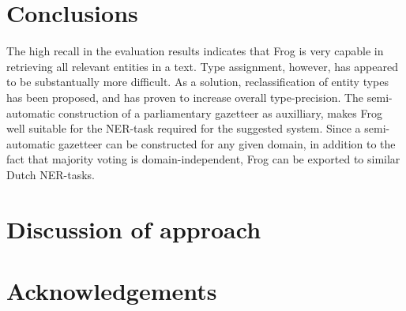 \section{Conclusions}
\label{sec:conc}
The high recall in the evaluation results indicates that Frog is very capable in retrieving all relevant entities in a text. Type assignment, however, has appeared to be substantually more difficult. As a solution, reclassification of entity types has been proposed, and has proven to  increase overall type-precision. The semi-automatic construction of a parliamentary gazetteer as auxilliary, makes Frog well suitable for the NER-task required for the suggested system. Since a semi-automatic gazetteer can be constructed for any given domain, in addition to the fact that majority voting is domain-independent, Frog can be exported to similar Dutch NER-tasks.

\section{Discussion of approach}


\section{Acknowledgements}
